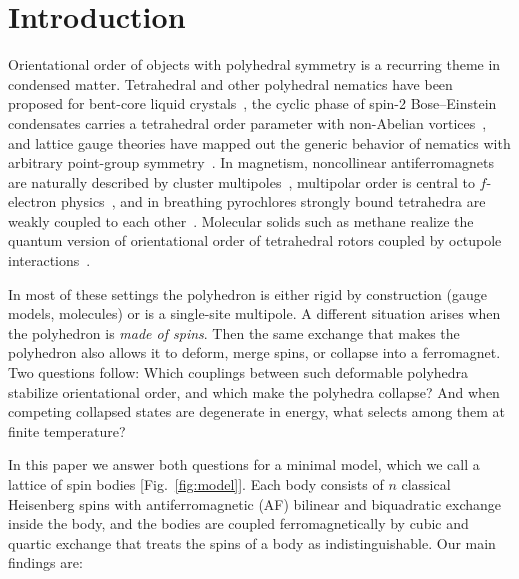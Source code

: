 \documentclass[pre,twocolumn,superscriptaddress,amsmath,amssymb,floatfix]{revtex4-2}
\begin{document}
\maketitle

\section{Introduction}

Orientational order of objects with polyhedral symmetry is a recurring theme in condensed matter. Tetrahedral and other polyhedral nematics have been proposed for bent-core liquid crystals~\cite{Fel1995,Lubensky2002}, the cyclic phase of spin-2 Bose--Einstein condensates carries a tetrahedral order parameter with non-Abelian vortices~\cite{SemenoffZhou2007,Kobayashi2009,KawaguchiUeda2012}, and lattice gauge theories have mapped out the generic behavior of nematics with arbitrary point-group symmetry~\cite{Liu2016,Nissinen2016,LiuGreitemannPollet2018}. In magnetism, noncollinear antiferromagnets are naturally described by cluster multipoles~\cite{Suzuki2017}, multipolar order is central to $f$-electron physics~\cite{Kuramoto2009}, and in breathing pyrochlores strongly bound tetrahedra are weakly coupled to each other~\cite{Okamoto2013,Rau2016}. Molecular solids such as methane realize the quantum version of orientational order of tetrahedral rotors coupled by octupole interactions~\cite{JamesKeenan1959}.

In most of these settings the polyhedron is either rigid by construction (gauge models, molecules) or is a single-site multipole. A different situation arises when the polyhedron is \emph{made of spins}. Then the same exchange that makes the polyhedron also allows it to deform, merge spins, or collapse into a ferromagnet. Two questions follow: Which couplings between such deformable polyhedra stabilize orientational order, and which make the polyhedra collapse? And when competing collapsed states are degenerate in energy, what selects among them at finite temperature?

In this paper we answer both questions for a minimal model, which we call a lattice of spin bodies [Fig.~\ref{fig:model}]. Each body consists of $n$ classical Heisenberg spins with antiferromagnetic (AF) bilinear and biquadratic exchange inside the body, and the bodies are coupled ferromagnetically by cubic and quartic exchange that treats the spins of a body as indistinguishable. Our main findings are:
\end{document}
